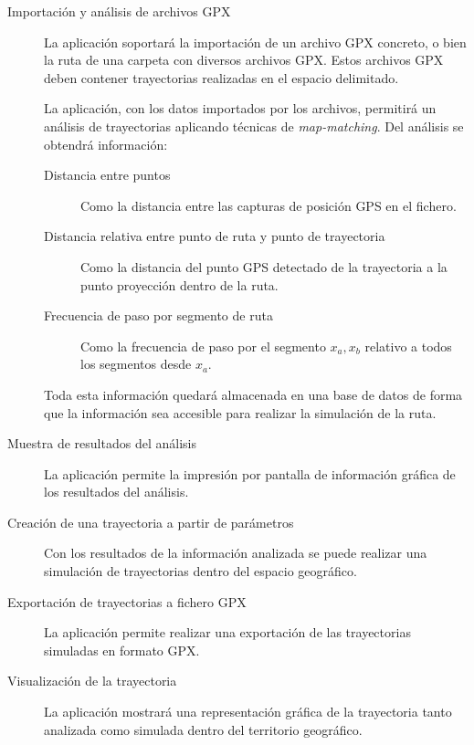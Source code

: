 \begin{description}
\item [Importación y análisis de archivos \ac{GPX}] La aplicación soportará la importación de un archivo GPX concreto, 
o bien la ruta de una carpeta con diversos archivos GPX. Estos archivos GPX deben contener trayectorias realizadas en 
el espacio delimitado.

La aplicación, con los datos importados por los archivos, permitirá un análisis de trayectorias aplicando técnicas de 
\textit{map-matching}. Del análisis se obtendrá información:
\begin{description} 
\item[Distancia entre puntos] Como la distancia entre las capturas de posición \ac{GPS} en el fichero.
\item[Distancia relativa entre punto de ruta y punto de trayectoria] Como la distancia del punto \ac{GPS} detectado 
de la trayectoria a la punto proyección dentro de la ruta.
\item[Frecuencia de paso por segmento de ruta] Como la frecuencia de paso por el segmento $x_{a}, x_{b}$ relativo 
a todos los segmentos desde $x_{a}$.
\end{description}


Toda esta información quedará almacenada en una base de datos de forma que la información sea accesible para realizar la simulación de la ruta.

\item [Muestra de resultados del análisis] La aplicación permite la impresión por pantalla de información gráfica de los resultados del análisis.
\item [Creación de una trayectoria a partir de parámetros] Con los resultados de la información analizada se puede realizar una simulación de trayectorias dentro del espacio geográfico.
\item [Exportación de trayectorias a fichero \ac{GPX}] La aplicación permite realizar una exportación de las trayectorias simuladas en formato GPX.
\item [Visualización de la trayectoria] La aplicación mostrará una representación gráfica de la trayectoria tanto analizada como simulada dentro del territorio geográfico.

\end{description}
